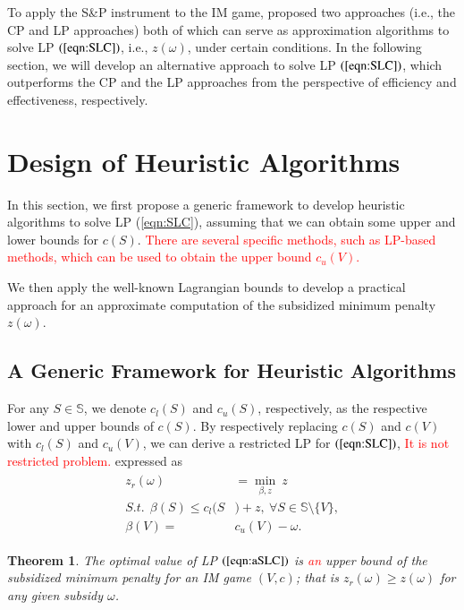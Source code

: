 \documentclass[authoryear,review,12pt]{elsarticle}
\newtheorem{theorem}{Theorem}
\begin{document}
To apply the S\&P instrument to the IM game, \cite{leastcore2018} proposed two approaches (i.e., the CP and LP approaches) both of which can serve as approximation algorithms to solve LP $(\ref{eqn:SLC})$, i.e., $z(\omega)$, under certain conditions.
In the following section, we will develop an alternative approach to solve LP $(\ref{eqn:SLC})$, which outperforms the CP and the LP approaches from the perspective of efficiency and effectiveness, respectively.



\section{Design of Heuristic Algorithms}\label{section:general}
In this section, we first propose a generic framework to develop heuristic algorithms to solve LP (\ref{eqn:SLC}), assuming that we can obtain some upper and lower bounds for $c(S)$.
\textcolor{red}{There are several specific methods, such as LP-based methods, which can be used to obtain the upper bound $c_u(V)$.}

We then apply the well-known Lagrangian bounds to develop a practical approach for an approximate computation of the subsidized minimum penalty $z(\omega)$.


\subsection{A Generic Framework for Heuristic Algorithms}

For any $S \in \mathbb{S}$, we denote $c_l(S)$ and $c_u(S)$, respectively, as the respective lower and upper bounds of $c(S)$. By respectively replacing $c(S)$ and $c(V)$ with $c_l(S)$ and $c_u(V)$, we can derive a restricted LP for $(\ref{eqn:SLC})$,
\textcolor{red}{It is not restricted problem.}
expressed as
\begin{eqnarray}\label{eqn:aSLC}
\begin{aligned}
z_r(\omega) &= \min_{\beta,z}~ z\\
S.t.~~\beta(S) \leq c_l(S&)+z,~\forall S \in \mathbb{S} \setminus \big\{V\big\},\\
\beta(V)=&c_u(V)-\omega.
\end{aligned}
\end{eqnarray}


\begin{theorem}\label{thm:rb}
The optimal value of LP $(\ref{eqn:aSLC})$ is \textcolor{red}{an} upper bound of the subsidized minimum penalty for an IM game $(V,c)$; that is $z_r(\omega) \geq z(\omega)$ for any given subsidy $\omega$.
\end{theorem}
\end{document}
